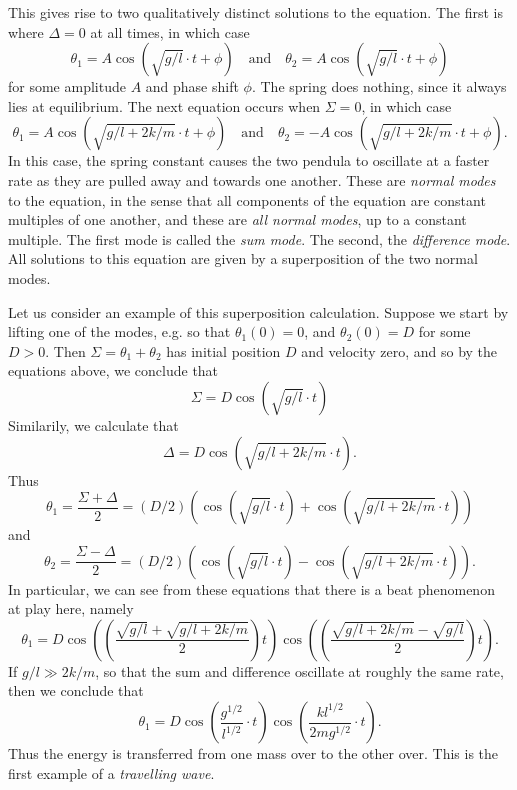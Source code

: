 This gives rise to two qualitatively distinct solutions to the equation. The first is where $\Delta = 0$ at all times, in which case
%
\[ \theta_1 = A \cos \left( \sqrt{g/l} \cdot t + \phi \right) \quad\text{and}\quad \theta_2 = A \cos \left(\sqrt{g/l} \cdot t + \phi \right) \]
%
for some amplitude $A$ and phase shift $\phi$. The spring does nothing, since it always lies at equilibrium. The next equation occurs when $\Sigma = 0$, in which case
%
\[ \theta_1 = A \cos \left( \sqrt{g/l + 2k/m} \cdot t + \phi \right) \quad\text{and}\quad \theta_2 = - A \cos \left( \sqrt{g/l + 2k/m} \cdot t + \phi \right). \]
%
In this case, the spring constant causes the two pendula to oscillate at a faster rate as they are pulled away and towards one another. These are \emph{normal modes} to the equation, in the sense that all components of the equation are constant multiples of one another, and these are \emph{all normal modes}, up to a constant multiple. The first mode is called the \emph{sum mode}. The second, the \emph{difference mode}. All solutions to this equation are given by a superposition of the two normal modes.

Let us consider an example of this superposition calculation. Suppose we start by lifting one of the modes, e.g. so that $\theta_1(0) = 0$, and $\theta_2(0) = D$ for some $D > 0$. Then $\Sigma = \theta_1 + \theta_2$ has initial position $D$ and velocity zero, and so by the equations above, we conclude that
%
\[ \Sigma = D \cos \left( \sqrt{g/l} \cdot t \right) \]
%
Similarily, we calculate that
%
\[ \Delta = D \cos \left( \sqrt{g/l + 2k/m} \cdot t \right). \]
%
Thus
%
\[ \theta_1 = \frac{\Sigma + \Delta}{2} = (D/2) \left( \cos \left( \sqrt{g/l} \cdot t \right) + \cos \left( \sqrt{g/l + 2k/m} \cdot t \right) \right) \]
%
and
%
\[ \theta_2 = \frac{\Sigma - \Delta}{2} = (D/2) \left( \cos \left( \sqrt{g/l} \cdot t \right) - \cos \left( \sqrt{g/l + 2k/m} \cdot t \right) \right). \]
%
In particular, we can see from these equations that there is a beat phenomenon at play here, namely
%
\[ \theta_1 = D \cos \left( \left( \frac{\sqrt{g/l} + \sqrt{g/l + 2k/m}}{2} \right) t \right) \cos \left( \left( \frac{\sqrt{g/l + 2k/m} - \sqrt{g/l}}{2} \right) t \right). \]
%
If $g/l \gg 2k/m$, so that the sum and difference oscillate at roughly the same rate, then we conclude that
%
\[ \theta_1 = D \cos \left( \frac{g^{1/2}}{l^{1/2}} \cdot t \right) \cos \left( \frac{k l^{1/2}}{2 m g^{1/2}} \cdot t \right). \]
%
Thus the energy is transferred from one mass over to the other over. This is the first example of a \emph{travelling wave}.







